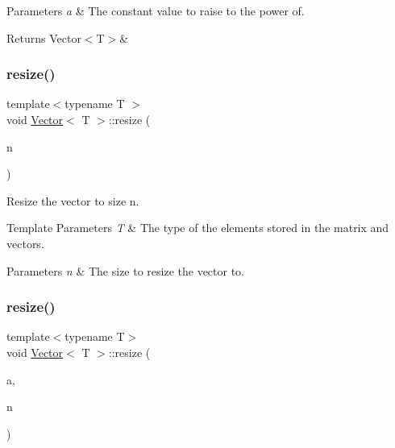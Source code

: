 \begin{DoxyParams}{Parameters}
{\em a} & The constant value to raise to the power of. \\
\hline
\end{DoxyParams}
\begin{DoxyReturn}{Returns}
Vector$<$\+T$>$\& 
\end{DoxyReturn}
\mbox{\label{classVector_ae751d4bf4c403e4578a9df1202e93f56}} 
\subsubsection{\texorpdfstring{resize()}{resize()}\hspace{0.1cm}{\footnotesize\ttfamily [1/2]}}
{\footnotesize\ttfamily template$<$typename T $>$ \\
void \mbox{\hyperlink{classVector}{Vector}}$<$ T $>$\+::resize (\begin{DoxyParamCaption}\item[{const unsigned int}]{n }\end{DoxyParamCaption})\hspace{0.3cm}{\ttfamily [inline]}}



Resize the vector to size {\ttfamily n}. 


\begin{DoxyTemplParams}{Template Parameters}
{\em T} & The type of the elements stored in the matrix and vectors. \\
\hline
\end{DoxyTemplParams}

\begin{DoxyParams}{Parameters}
{\em n} & The size to resize the vector to. \\
\hline
\end{DoxyParams}
\mbox{\label{classVector_a1ff5ed0bca47854450eb78024c6f52ff}} 
\subsubsection{\texorpdfstring{resize()}{resize()}\hspace{0.1cm}{\footnotesize\ttfamily [2/2]}}
{\footnotesize\ttfamily template$<$typename T$>$ \\
void \mbox{\hyperlink{classVector}{Vector}}$<$ T $>$\+::resize (\begin{DoxyParamCaption}\item[{const T \&}]{a,  }\item[{const unsigned int}]{n }\end{DoxyParamCaption})\hspace{0.3cm}{\ttfamily [inline]}}



